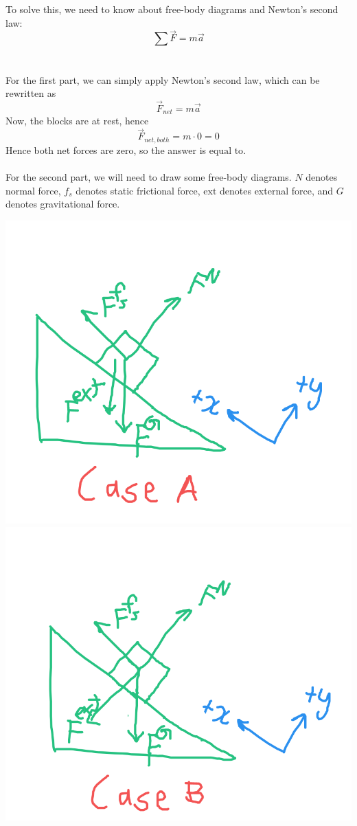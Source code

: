\documentclass[11pt]{scrartcl}
\begin{document}
\begin{soln}
  To solve this, we need to know about free-body diagrams and Newton's second law:
  $$\sum \overrightarrow{F}=m\overrightarrow{a}$$
  \\ \\
  For the first part, we can simply apply Newton's second law, which can be rewritten as
  $$\overrightarrow{F}_{net}=m\overrightarrow{a}$$
  Now, the blocks are at rest, hence
  $$\overrightarrow{F}_{net,both}=m\cdot 0=0$$
  Hence both net forces are zero, so the answer is $\boxed{\text{equal to}}$.
  \\ \\
  For the second part, we will need to draw some free-body diagrams. $N$ denotes normal force, $f_s$ denotes static frictional force, $\text{ext}$ denotes external
  force, and $G$ denotes gravitational force.
  \begin{center}
    \includegraphics[scale=0.3]{CaseA.png}
    \includegraphics[scale=0.3]{CaseB.png}

\end{center}
\end{soln}
\end{document}
